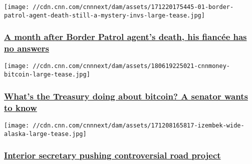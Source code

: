 \href{/2017/12/20/us/border-patrol-agent-death-still-a-mystery-invs/index.html}{}

\texttt{[image: //cdn.cnn.com/cnnnext/dam/assets/171220175445-01-border-patrol-agent-death-still-a-mystery-invs-large-tease.jpg]}

\hypertarget{a-month-after-border-patrol-agents-death-his-fiancuxe9e-has-no-answers}{%
\subsubsection{\texorpdfstring{\href{/2017/12/20/us/border-patrol-agent-death-still-a-mystery-invs/index.html}{A
month after Border Patrol agent's death, his fiancée has no
answers}}{A month after Border Patrol agent's death, his fiancée has no answers}}\label{a-month-after-border-patrol-agents-death-his-fiancuxe9e-has-no-answers}}

\href{http://money.cnn.com/2017/12/14/news/economy/senator-treasury-bitcoin/index.html}{}

\texttt{[image: //cdn.cnn.com/cnnnext/dam/assets/180619225021-cnnmoney-bitcoin-large-tease.jpg]}

\hypertarget{whats-the-treasury-doing-about-bitcoin-a-senator-wants-to-know}{%
\subsubsection{\texorpdfstring{\href{http://money.cnn.com/2017/12/14/news/economy/senator-treasury-bitcoin/index.html}{What's
the Treasury doing about bitcoin? A senator wants to
know}}{What's the Treasury doing about bitcoin? A senator wants to know}}\label{whats-the-treasury-doing-about-bitcoin-a-senator-wants-to-know}}

\href{/2017/12/10/politics/alaska-izembek-road-zinke-invs/index.html}{}

\texttt{[image: //cdn.cnn.com/cnnnext/dam/assets/171208165817-izembek-wide-alaska-large-tease.jpg]}

\hypertarget{interior-secretary-pushing-controversial-road-project}{%
\subsubsection{\texorpdfstring{\href{/2017/12/10/politics/alaska-izembek-road-zinke-invs/index.html}{Interior
secretary pushing controversial road
project}}{Interior secretary pushing controversial road project}}\label{interior-secretary-pushing-controversial-road-project}}

\href{/2017/12/07/us/zarrab-iran-sanctions-trial/index.html}{}

